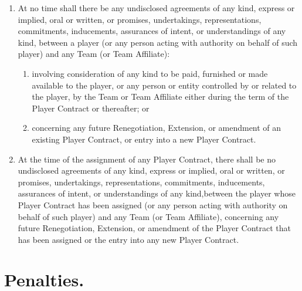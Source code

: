 \documentclass[
]{book}
\providecommand{\tightlist}{%
  \setlength{\itemsep}{0pt}\setlength{\parskip}{0pt}}
\begin{document}
\begin{enumerate}
\def\labelenumi{(\alph{enumi})}
\tightlist
\item
  At no time shall there be any undisclosed agreements of any kind, express or implied, oral or written, or promises, undertakings, representations, commitments, inducements, assurances of intent, or understandings of any kind, between a player (or any person acting with authority on behalf of such player) and any Team (or Team Affiliate):

  \begin{enumerate}
  \def\labelenumii{(\roman{enumii})}
  \tightlist
  \item
    involving consideration of any kind to be paid, furnished or made available to the player, or any person or entity controlled by or related to the player, by the Team or Team Affiliate either during the term of the Player Contract or thereafter; or
  \item
    concerning any future Renegotiation, Extension, or amendment of an existing Player Contract, or entry into a new Player Contract.
  \end{enumerate}
\item
  At the time of the assignment of any Player Contract, there shall be no undisclosed agreements of any kind, express or implied, oral or written, or promises, undertakings, representations, commitments, inducements, assurances of intent, or understandings of any kind,between the player whose Player Contract has been assigned (or any person acting with authority on behalf of such player) and any Team (or Team Affiliate), concerning any future Renegotiation, Extension, or amendment of the Player Contract that has been assigned or the entry into any new Player Contract.
\end{enumerate}

\hypertarget{penalties.}{%
\section{Penalties.}\label{penalties.}}
\end{document}
